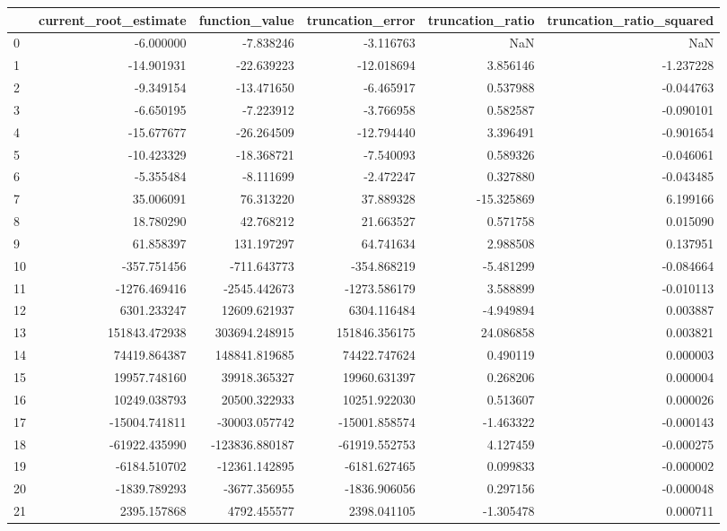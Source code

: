 \begin{tabular}{lrrrrr}
\toprule
 & current_root_estimate & function_value & truncation_error & truncation_ratio & truncation_ratio_squared \\
\midrule
0 & -6.000000 & -7.838246 & -3.116763 & NaN & NaN \\
1 & -14.901931 & -22.639223 & -12.018694 & 3.856146 & -1.237228 \\
2 & -9.349154 & -13.471650 & -6.465917 & 0.537988 & -0.044763 \\
3 & -6.650195 & -7.223912 & -3.766958 & 0.582587 & -0.090101 \\
4 & -15.677677 & -26.264509 & -12.794440 & 3.396491 & -0.901654 \\
5 & -10.423329 & -18.368721 & -7.540093 & 0.589326 & -0.046061 \\
6 & -5.355484 & -8.111699 & -2.472247 & 0.327880 & -0.043485 \\
7 & 35.006091 & 76.313220 & 37.889328 & -15.325869 & 6.199166 \\
8 & 18.780290 & 42.768212 & 21.663527 & 0.571758 & 0.015090 \\
9 & 61.858397 & 131.197297 & 64.741634 & 2.988508 & 0.137951 \\
10 & -357.751456 & -711.643773 & -354.868219 & -5.481299 & -0.084664 \\
11 & -1276.469416 & -2545.442673 & -1273.586179 & 3.588899 & -0.010113 \\
12 & 6301.233247 & 12609.621937 & 6304.116484 & -4.949894 & 0.003887 \\
13 & 151843.472938 & 303694.248915 & 151846.356175 & 24.086858 & 0.003821 \\
14 & 74419.864387 & 148841.819685 & 74422.747624 & 0.490119 & 0.000003 \\
15 & 19957.748160 & 39918.365327 & 19960.631397 & 0.268206 & 0.000004 \\
16 & 10249.038793 & 20500.322933 & 10251.922030 & 0.513607 & 0.000026 \\
17 & -15004.741811 & -30003.057742 & -15001.858574 & -1.463322 & -0.000143 \\
18 & -61922.435990 & -123836.880187 & -61919.552753 & 4.127459 & -0.000275 \\
19 & -6184.510702 & -12361.142895 & -6181.627465 & 0.099833 & -0.000002 \\
20 & -1839.789293 & -3677.356955 & -1836.906056 & 0.297156 & -0.000048 \\
21 & 2395.157868 & 4792.455577 & 2398.041105 & -1.305478 & 0.000711 \\

\end{tabular}
